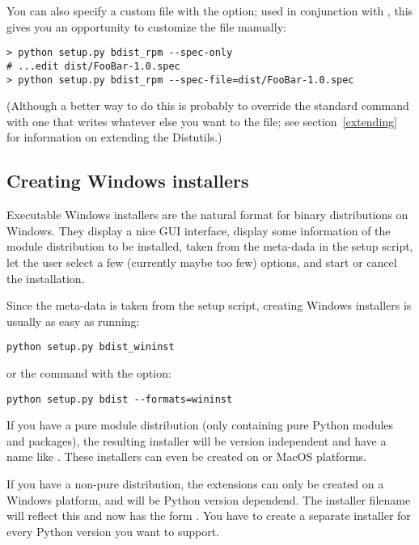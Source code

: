 \documentclass{howto}
\begin{document}
You can also specify a custom  file with the
 option; used in conjunction with
, this gives you an opportunity to customize
the  file manually:
\begin{verbatim}
> python setup.py bdist_rpm --spec-only
# ...edit dist/FooBar-1.0.spec
> python setup.py bdist_rpm --spec-file=dist/FooBar-1.0.spec
\end{verbatim}
(Although a better way to do this is probably to override the standard
 command with one that writes whatever else you want
to the  file; see section~\ref{extending} for information on
extending the Distutils.)


\subsection{Creating Windows installers}
\label{creating-wininst}

Executable Windows installers are the natural format for binary
distributions on Windows. They display a nice GUI interface, display
some information of the module distribution to be installed, taken
from the meta-dada in the setup script, let the user select a few
(currently maybe too few) options, and start or cancel the installation.

Since the meta-data is taken from the setup script, creating
Windows installers is usually as easy as running:
\begin{verbatim}
python setup.py bdist_wininst
\end{verbatim}
or the  command with the  option:
\begin{verbatim}
python setup.py bdist --formats=wininst
\end{verbatim}

If you have a pure module distribution (only containing pure
Python modules and packages), the resulting installer will be
version independent and have a name like .
These installers can even be created on \UNIX{} or MacOS platforms.

If you have a non-pure distribution, the extensions can only be
created on a Windows platform, and will be Python version dependend.
The installer filename will reflect this and now has the form
. You have to create a separate installer
for every Python version you want to support.
\end{document}
